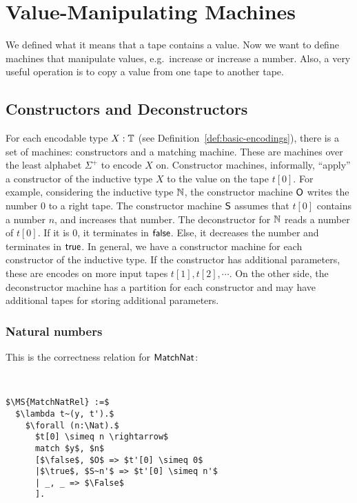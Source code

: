 \section{Value-Manipulating Machines}
\label{sec:value-manipulate}


We {\color{red}defined} what it means that a tape contains a value.  Now we want to define machines that manipulate values, e.g.\ increase or increase a number.
Also, a very useful operation is to copy a value from one tape to another tape.

\subsection{Constructors and Deconstructors}
\label{sec:constructors-deconstructors}


For each encodable type $X:\mathbb{T}$ (see Definition~\ref{def:basic-encodings}), there is a set of machines: constructors and a matching machine.  These
are machines over the least alphabet $\Sigma^+$ to encode $X$ on.  Constructor machines, informally, ``apply'' a constructor of the inductive type $X$
to the value on the tape $t[0]$.  For example, considering the inductive type $\mathbb{N}$, the constructor machine $\textsf{O}$ writes the number $0$ to a
right tape.  The constructor machine $\textsf{S}$ assumes that $t[0]$ contains a number $n$, and increases that number.  The deconstructor for $\mathbb{N}$
reads a number of $t[0]$.  If it is $0$, it terminates in $\textsf{false}$.  Else, it decreases the number and terminates in $\textsf{true}$.  In general, we have a
constructor machine for each constructor of the inductive type.  If the constructor has additional parameters, these are encodes on more input tapes
$t[1], t[2], \cdots$.  On the other side, the deconstructor machine has a partition for each constructor and may have additional tapes for storing
additional parameters.

\subsubsection{Natural numbers}
\label{sec:match-nat}

This is the correctness relation for $\textsf{MatchNat}$:
\begin{definition}
  \label{def:MatchNat_Rel}
  ~
\begin{lstlisting}[style=semicoqstyle]
$\MS{MatchNatRel} :=$
  $\lambda t~(y, t').$
    $\forall (n:\Nat).$
      $t[0] \simeq n \rightarrow$
      match $y$, $n$
      [$\false$, $O$ => $t'[0] \simeq 0$
      |$\true$, $S~n'$ => $t'[0] \simeq n'$
      | _, _ => $\False$
      ].
\end{lstlisting}
\end{definition}

